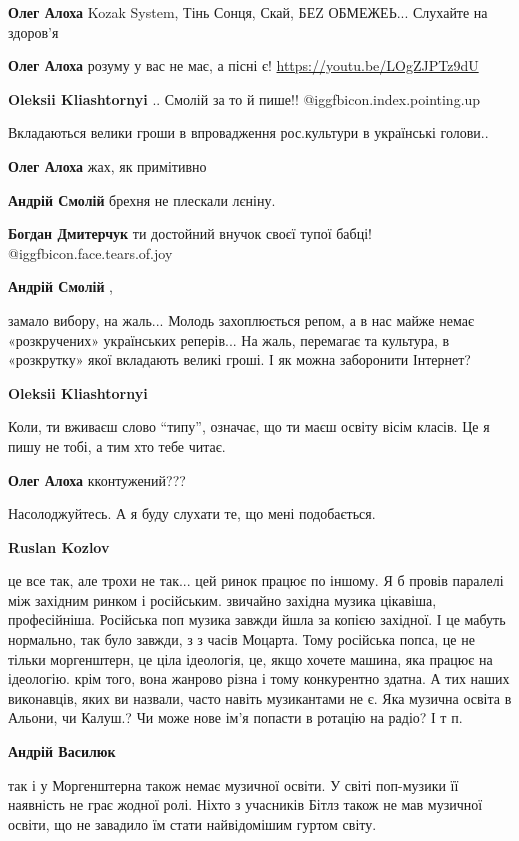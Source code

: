 \begin{itemize}
\begin{itemize}
\textbf{Олег Алоха} Kozak System, Тінь Сонця, Скай, БЕZ ОБМЕЖЕЬ...
Слухайте на здоров'я

\textbf{Олег Алоха} розуму у вас не має, а пісні є!
\url{https://youtu.be/LOgZJPTz9dU}

\textbf{Oleksii Kliashtornyi} .. Смолій за то й пише!! @igg{fbicon.index.pointing.up}

Вкладаються велики гроши в впровадження рос.культури в українські голови..

\textbf{Олег Алоха} жах, як примітивно

\textbf{Андрій Смолій} брехня не плескали лєніну.

\textbf{Богдан Дмитерчук} ти достойний внучок своєї тупої бабці! @igg{fbicon.face.tears.of.joy} 

\textbf{Андрій Смолій} , 

замало вибору, на жаль... Молодь захоплюється репом, а в нас майже немає
«розкручених» українських реперів... На жаль, перемагає та культура, в «розкрутку»
якої вкладають великі гроші. І як можна заборонити Інтернет?

\textbf{Oleksii Kliashtornyi} 

Коли, ти вживаєш слово \enquote{типу}, означає, що ти маєш освіту вісім класів. Це я пишу не тобі, а тим хто тебе читає.


\textbf{Олег Алоха} кконтужений???

Насолоджуйтесь.
А я буду слухати те, що мені подобається.

\textbf{Ruslan Kozlov} 

це все так, але трохи не так... цей ринок працює по іншому. Я б провів паралелі
між західним ринком і російським. звичайно західна музика
цікавіша, професійніша. Російська поп музика завжди йшла за копією західної. І це
мабуть нормально, так було завжди, з з часів Моцарта. Тому російська попса, це не
тільки моргенштерн, це ціла ідеологія, це, якщо хочете машина, яка працює на
ідеологію. крім того, вона жанрово різна і тому конкурентно здатна. А тих наших
виконавців, яких ви назвали, часто навіть музикантами не є. Яка музична освіта в
Альони, чи Калуш.? Чи може нове ім'я попасти в ротацію на радіо? І т п.

\textbf{Андрій Василюк} 

так і у Моргенштерна також немає музичної освіти. У світі поп-музики її
наявність не грає жодної ролі. Ніхто з учасників Бітлз також не мав музичної
освіти, що не завадило їм стати найвідомішим гуртом світу.


\end{itemize}
\end{itemize}
